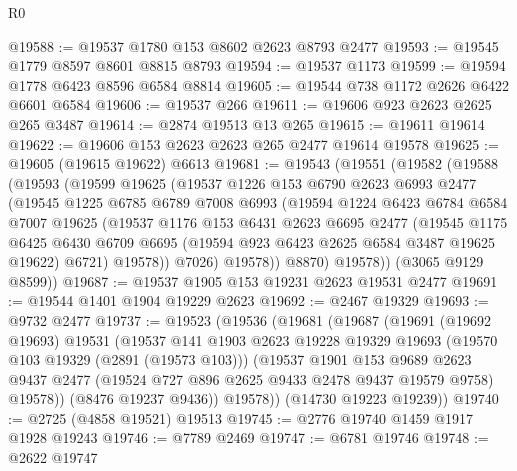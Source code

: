 \begin{lexlean}{R0}
\begin{coremodule}
@19588 := @19537 @1780 @153 @8602 @2623 @8793 @2477
@19593 := @19545 @1779 @8597 @8601 @8815 @8793
@19594 := @19537 @1173
@19599 := @19594 @1778 @6423 @8596 @6584 @8814
@19605 := @19544 @738 @1172 @2626 @6422 @6601 @6584
@19606 := @19537 @266
@19611 := @19606 @923 @2623 @2625 @265 @3487
@19614 := @2874 @19513 @13 @265
@19615 := @19611 @19614
@19622 := @19606 @153 @2623 @2623 @265 @2477 @19614 @19578
@19625 := @19605 (@19615 @19622) @6613
@19681 := @19543
    (@19551
      (@19582
        (@19588
          (@19593
            (@19599
              @19625
              (@19537
                @1226
                @153
                @6790
                @2623
                @6993
                @2477
                (@19545
                  @1225
                  @6785
                  @6789
                  @7008
                  @6993
                  (@19594
                    @1224
                    @6423
                    @6784
                    @6584
                    @7007
                    @19625
                    (@19537
                      @1176
                      @153
                      @6431
                      @2623
                      @6695
                      @2477
                      (@19545
                        @1175
                        @6425
                        @6430
                        @6709
                        @6695
                        (@19594 @923 @6423 @2625 @6584 @3487 @19625 @19622)
                        @6721)
                      @19578))
                  @7026)
                @19578))
            @8870)
          @19578))
      (@3065 @9129 @8599))
@19687 := @19537 @1905 @153 @19231 @2623 @19531 @2477
@19691 := @19544 @1401 @1904 @19229 @2623
@19692 := @2467 @19329
@19693 := @9732 @2477
@19737 := @19523
    (@19536
      (@19681
        (@19687
          (@19691
            (@19692 @19693)
            @19531
            (@19537
              @141
              @1903
              @2623
              @19228
              @19329
              @19693
              (@19570 @103 @19329 (@2891 (@19573 @103)))
              (@19537
                @1901
                @153
                @9689
                @2623
                @9437
                @2477
                (@19524 @727 @896 @2625 @9433 @2478 @9437 @19579 @9758)
                @19578))
            (@8476 @19237 @9436))
          @19578))
      (@14730 @19223 @19239))
@19740 := @2725 (@4858 @19521) @19513
@19745 := @2776 @19740 @1459 @1917 @1928 @19243
@19746 := @7789 @2469
@19747 := @6781 @19746
@19748 := @2622 @19747

\end{coremodule}
\end{lexlean}

